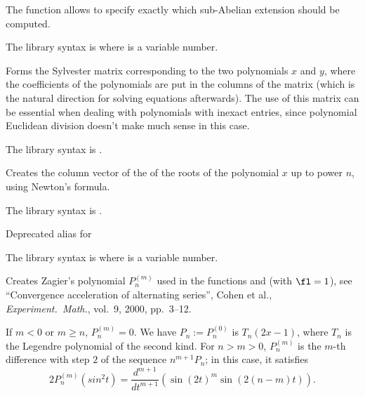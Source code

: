 The function  allows to specify exactly which
sub-Abelian extension should be computed.

The library syntax is  where  is a variable number.

\label{se:polsylvestermatrix}
Forms the Sylvester matrix
corresponding to the two polynomials $x$ and $y$, where the coefficients of
the polynomials are put in the columns of the matrix (which is the natural
direction for solving equations afterwards). The use of this matrix can be
essential when dealing with polynomials with inexact entries, since
polynomial Euclidean division doesn't make much sense in this case.

The library syntax is .

\label{se:polsym}
Creates the column vector of the  of the roots of the
polynomial $x$ up to power $n$, using Newton's formula.

The library syntax is .

\label{se:poltchebi}
Deprecated alias for 

The library syntax is  where  is a variable number.

\label{se:polzagier}
Creates Zagier's polynomial $P_n^{(m)}$ used in
the functions  and  (with $\fl=1$), see
``Convergence acceleration of alternating series'', Cohen et al.,
\emph{Experiment.~Math.}, vol.~9, 2000, pp.~3--12.

If $m < 0$ or $m \ge n$, $P_n^{(m)} = 0$.
We have
$P_n := P_n^{(0)}$ is $T_n(2x-1)$, where $T_n$ is the Legendre polynomial of
the second kind. For $n > m > 0$, $P_n^{(m)}$ is the $m$-th difference with
step $2$ of the sequence $n^{m+1}P_n$; in this case, it satisfies
$$2 P_n^{(m)}(sin^2 t) = \dfrac{d^{m+1}}{dt^{m+1}}(\sin(2t)^m \sin(2(n-m)t)).$$



